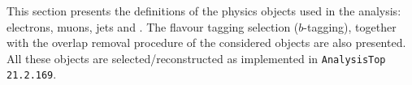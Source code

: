 %
This section presents the definitions of the physics objects used in the analysis: electrons, muons, jets and \MET.  
The flavour tagging selection ($b$-tagging), together with the overlap removal procedure of the considered objects are also presented. 
All these objects are selected/reconstructed as implemented  in \texttt{AnalysisTop 21.2.169}.
